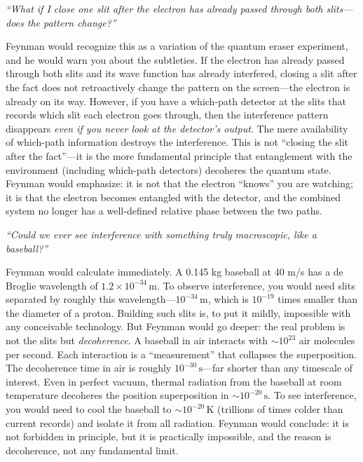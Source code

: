\textit{``What if I close one slit after the electron has already passed through both slits---does the pattern change?''}

Feynman would recognize this as a variation of the quantum eraser experiment, and he would warn you about the subtleties. If the electron has already passed through both slits and its wave function has already interfered, closing a slit after the fact does not retroactively change the pattern on the screen---the electron is already on its way. However, if you have a which-path detector at the slits that records which slit each electron goes through, then the interference pattern disappears \emph{even if you never look at the detector's output}. The mere availability of which-path information destroys the interference. This is not ``closing the slit after the fact''---it is the more fundamental principle that entanglement with the environment (including which-path detectors) decoheres the quantum state. Feynman would emphasize: it is not that the electron ``knows'' you are watching; it is that the electron becomes entangled with the detector, and the combined system no longer has a well-defined relative phase between the two paths.

\textit{``Could we ever see interference with something truly macroscopic, like a baseball?''}

Feynman would calculate immediately. A 0.145 kg baseball at 40 m/s has a de Broglie wavelength of $1.2\times 10^{-34}\,\text{m}$. To observe interference, you would need slits separated by roughly this wavelength---$10^{-34}\,\text{m}$, which is $10^{-19}$ times smaller than the diameter of a proton. Building such slits is, to put it mildly, impossible with any conceivable technology. But Feynman would go deeper: the real problem is not the slits but \emph{decoherence}. A baseball in air interacts with $\sim 10^{23}$ air molecules per second. Each interaction is a ``measurement'' that collapses the superposition. The decoherence time in air is roughly $10^{-30}\,\text{s}$---far shorter than any timescale of interest. Even in perfect vacuum, thermal radiation from the baseball at room temperature decoheres the position superposition in $\sim 10^{-20}\,\text{s}$. To see interference, you would need to cool the baseball to $\sim 10^{-20}\,\text{K}$ (trillions of times colder than current records) and isolate it from all radiation. Feynman would conclude: it is not forbidden in principle, but it is practically impossible, and the reason is decoherence, not any fundamental limit.

